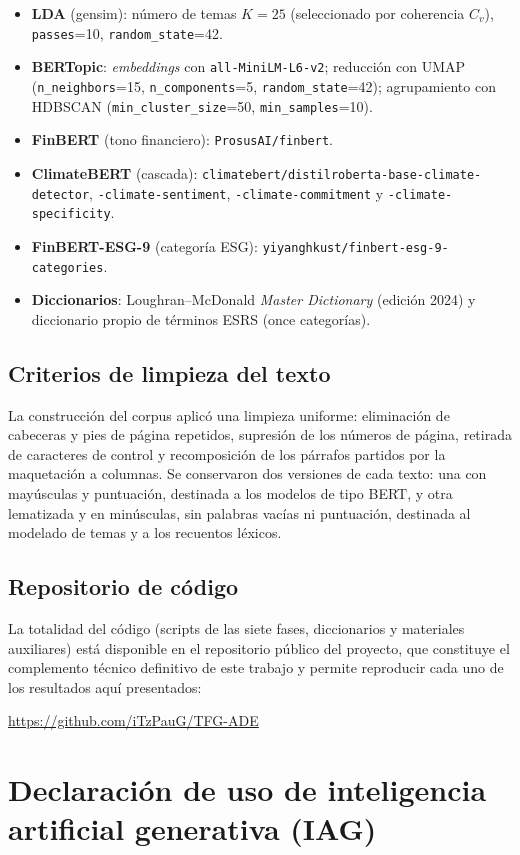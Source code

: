 \begin{itemize}
    \item \textbf{LDA} (gensim): número de temas $K=25$ (seleccionado por coherencia $C_v$),
    \texttt{passes}=10, \texttt{random\_state}=42.
    \item \textbf{BERTopic}: \textit{embeddings} con \texttt{all-MiniLM-L6-v2}; reducción con
    UMAP (\texttt{n\_neighbors}=15, \texttt{n\_components}=5, \texttt{random\_state}=42);
    agrupamiento con HDBSCAN (\texttt{min\_cluster\_size}=50, \texttt{min\_samples}=10).
    \item \textbf{FinBERT} (tono financiero): \texttt{ProsusAI/finbert}.
    \item \textbf{ClimateBERT} (cascada): \texttt{climatebert/distilroberta-base-climate-detector},
    \texttt{-climate-sentiment}, \texttt{-climate-commitment} y \texttt{-climate-specificity}.
    \item \textbf{FinBERT-ESG-9} (categoría ESG): \texttt{yiyanghkust/finbert-esg-9-categories}.
    \item \textbf{Diccionarios}: Loughran--McDonald \textit{Master Dictionary} (edición 2024) y
    diccionario propio de términos ESRS (once categorías).
\end{itemize}

\section*{Criterios de limpieza del texto}

La construcción del corpus aplicó una limpieza uniforme: eliminación de cabeceras y pies de
página repetidos, supresión de los números de página, retirada de caracteres de control y
recomposición de los párrafos partidos por la maquetación a columnas. Se conservaron dos
versiones de cada texto: una con mayúsculas y puntuación, destinada a los modelos de tipo BERT,
y otra lematizada y en minúsculas, sin palabras vacías ni puntuación, destinada al modelado de
temas y a los recuentos léxicos.

\section*{Repositorio de código}

La totalidad del código (scripts de las siete fases, diccionarios y materiales auxiliares) está
disponible en el repositorio público del proyecto, que constituye el complemento técnico
definitivo de este trabajo y permite reproducir cada uno de los resultados aquí presentados:

\begin{center}
\large\url{https://github.com/iTzPauG/TFG-ADE}
\end{center}

\chapter{Declaración de uso de inteligencia artificial generativa (IAG)}
\label{anexo:declaracion_iag}
\thispagestyle{empty}

